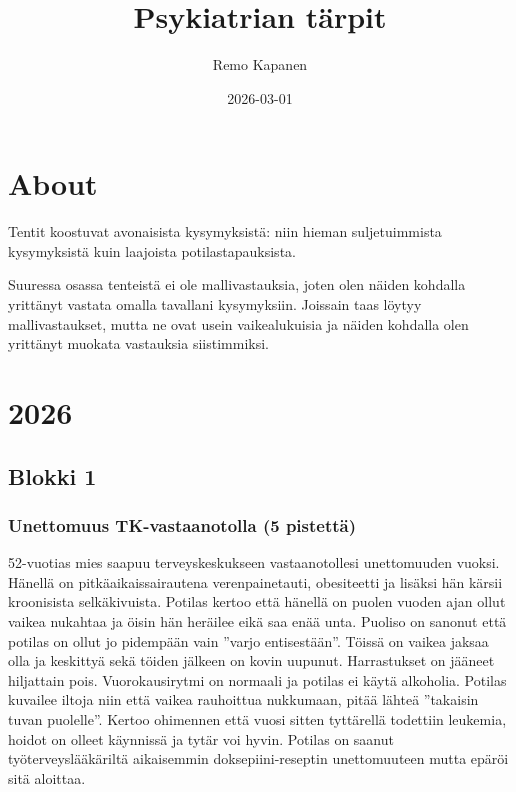 \documentclass[
]{book}
\title{Psykiatrian tärpit}
\author{Remo Kapanen}
\date{2026-03-01}
\begin{document}
\maketitle

{
\setcounter{tocdepth}{1}
\tableofcontents
}
\chapter{About}\label{about}

Tentit koostuvat avonaisista kysymyksistä: niin hieman suljetuimmista kysymyksistä kuin laajoista potilastapauksista.

Suuressa osassa tenteistä ei ole mallivastauksia, joten olen näiden kohdalla yrittänyt vastata omalla tavallani kysymyksiin. Joissain taas löytyy mallivastaukset, mutta ne ovat usein vaikealukuisia ja näiden kohdalla olen yrittänyt muokata vastauksia siistimmiksi.

\chapter{2026}\label{section}

\section{Blokki 1}\label{blokki-1}

\subsection{Unettomuus TK-vastaanotolla (5 pistettä)}\label{unettomuus-tk-vastaanotolla-5-pistettuxe4}

52-vuotias mies saapuu terveyskeskukseen vastaanotollesi unettomuuden vuoksi. Hänellä on pitkäaikaissairautena verenpainetauti, obesiteetti ja lisäksi hän kärsii kroonisista selkäkivuista. Potilas kertoo että hänellä on puolen vuoden ajan ollut vaikea nukahtaa ja öisin hän heräilee eikä saa enää unta. Puoliso on sanonut että potilas on ollut jo pidempään vain ''varjo entisestään''. Töissä on vaikea jaksaa olla ja keskittyä sekä töiden jälkeen on kovin uupunut. Harrastukset on jääneet hiljattain pois. Vuorokausirytmi on normaali ja potilas ei käytä alkoholia. Potilas kuvailee iltoja niin että vaikea rauhoittua nukkumaan, pitää lähteä ''takaisin tuvan puolelle''. Kertoo ohimennen että vuosi sitten tyttärellä todettiin leukemia, hoidot on olleet käynnissä ja tytär voi hyvin. Potilas on saanut työterveyslääkäriltä aikaisemmin doksepiini-reseptin unettomuuteen mutta epäröi sitä aloittaa.
\end{document}
